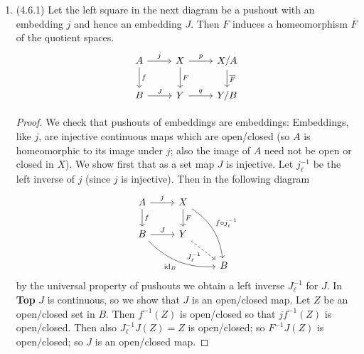 \documentclass[11pt]{article}
\newcommand{\catname}[1]{{\textbf{#1} }}
\newcommand{\Top}{\catname{Top}}
\DeclareMathOperator{\id}{id}
\begin{document}
\begin{enumerate}
\begin{proof}
      Hence the assignment is a homeomorphism as desired.
    \end{proof}
    \item (4.6.1) Let the left square in the next diagram be a pushout with an embedding $j$ and hence an embedding $J$. Then $F$ induces a homeomorphism $\overline{F}$ of the quotient spaces.%
    \[\begin{tikzcd}
        A & X & {X/A} \\
        B & Y & {Y/B}
        \arrow["f", from=1-1, to=2-1]
        \arrow["J", from=2-1, to=2-2]
        \arrow["j", from=1-1, to=1-2]
        \arrow["F", from=1-2, to=2-2]
        \arrow["{\overline{F}}", from=1-3, to=2-3]
        \arrow["p", from=1-2, to=1-3]
        \arrow["q", from=2-2, to=2-3]
    \end{tikzcd}\]\begin{proof}
      We check that pushouts of embeddings are embeddings: Embeddings, like $j$, are injective continuous maps which are open/closed (so $A$ is homeomorphic to its image under $j$; also the image of $A$ need not be open or closed in $X$). We show first that as a set map $J$ is injective. Let $j_\ell^{-1}$ be the left inverse of $j$ (since $j$ is injective). Then in the following diagram %
      \[\begin{tikzcd}
        A & X \\
        B & Y \\
        && B
        \arrow["f", from=1-1, to=2-1]
        \arrow["J", from=2-1, to=2-2]
        \arrow["j", from=1-1, to=1-2]
        \arrow["F", from=1-2, to=2-2]
        \arrow["{f\circ j_\ell^{-1}}", from=1-2, to=3-3, bend left=24]
        \arrow["{\id_B}"', from=2-1, to=3-3, bend right=24]
        \arrow["{J_\ell^{-1}}"', dashed, from=2-2, to=3-3]
      \end{tikzcd}\] by the universal property of pushouts we obtain a left inverse $J_\ell^{-1}$ for $J$. In \Top $J$ is continuous, so we show that $J$ is an open/closed map. Let $Z$ be an open/closed set in $B$. Then $f^{-1}(Z)$ is open/closed so that $jf^{-1}(Z)$ is open/closed. Then also $J_\ell^{-1}J(Z) = Z$ is open/closed; so $F^{-1}J(Z)$ is open/closed; so $J$ is an open/closed map.


\end{proof}
\end{enumerate}
\end{document}

